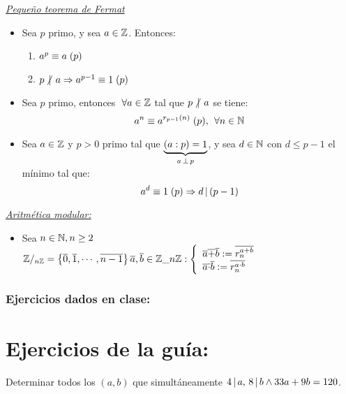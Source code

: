 \documentclass[12pt,a4paper, spanish]{article}
\begin{document}
\textit{\underline{Pequeño teorema de Fermat}}
\begin{itemize}
  \item Sea $p$ primo, y sea $a \en \enteros$. Entonces:
    \begin{enumerate}[label=\arabic*.)]
        \item $ \congruencia{a^p}{a}{p} $
        \item $ p \noDivide a \entonces \congruencia{a^{p-1}}{1}{p} $
      \end{enumerate}
  \item Sea $p$ primo, entonces $ \paratodo a \en \enteros$ tal que $ p \noDivide a$ se tiene:
    \[
      \congruencia{a^n}{a^{r_{p-1}(n)}}{p} ,\, \paratodo n \en \naturales 
    \]
  \item Sea $a \en \enteros$ y $p > 0$ primo tal que $\ub{(a:p) = 1}{a \cop p}$, y sea  $d \en \naturales$ con $d \leq p-1$
    el mínimo tal que:
    \[
      \congruencia{a^d}{1}{p} \entonces d \divide (p-1)
    \]  
\end{itemize}
\textit{\underline{Aritmética modular:}}
\begin{itemize}
  \item Sea $n \en \naturales, n\geq2$\\
    $
      \enteros/_{n\enteros} = \set{\clase{0},\clase{1},\cdots, \clase{n-1} }\\
      \clase{a},\clase{b} \en \enteros\_{n\enteros}:
      \llave{l}{
        \clase{a} \clase{+} \clase{b} := \overline{r_n^{a+b}} \\
        \clase{a} \clase{\cdot} \clase{b} := \overline{r_n^{a\cdot b}}
      }
    $
\end{itemize}



\subsubsection*{Ejercicios dados en clase:}

\newpage


\section*{Ejercicios de la guía:}
\setcounter{ejercicio}{0} %
\ejercicio
\ejercicio
Determinar todos los $(a,b)$ que simultáneamente $4 \divide a,\, 8 \divide b \y 33a + 9b = 120$.
\end{document}
